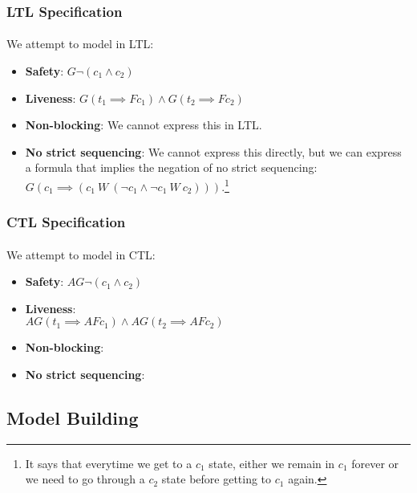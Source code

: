 \documentclass{article}
\theoremstyle{plain}
\theoremstyle{definition}
\begin{document}
\begin{multicols}{2}
\subsubsection{LTL Specification}

\paragraph{} We attempt to model in LTL:

\begin{itemize}
\item \textbf{Safety}: $G\lnot(c_1 \land c_2)$
\item \textbf{Liveness}: $G(t_1 \implies Fc_1) \land G(t_2 \implies Fc_2)$
\item \textbf{Non-blocking}: We cannot express this in LTL.
\item \textbf{No strict sequencing}: We cannot express this directly, but we can express a formula that implies the negation of no strict sequencing: $G(c_1 \implies (c_1\ W\ (\lnot c_1 \land \lnot c_1\ W\ c_2)))$.\footnote{It says that everytime we get to a $c_1$ state, either we remain in $c_1$ forever or we need to go through a $c_2$ state before getting to $c_1$ again.}
\end{itemize}

\subsubsection{CTL Specification}

\paragraph{} We attempt to model in CTL:

\begin{itemize}
\item \textbf{Safety}: $AG\lnot(c_1 \land c_2)$
\item \textbf{Liveness}:\\ $AG(t_1 \implies AFc_1) \land AG(t_2 \implies AFc_2)$
\item \textbf{Non-blocking}: 
\item \textbf{No strict sequencing}: 
\end{itemize}

\subsection{Model Building}


\end{multicols}
\end{document}
